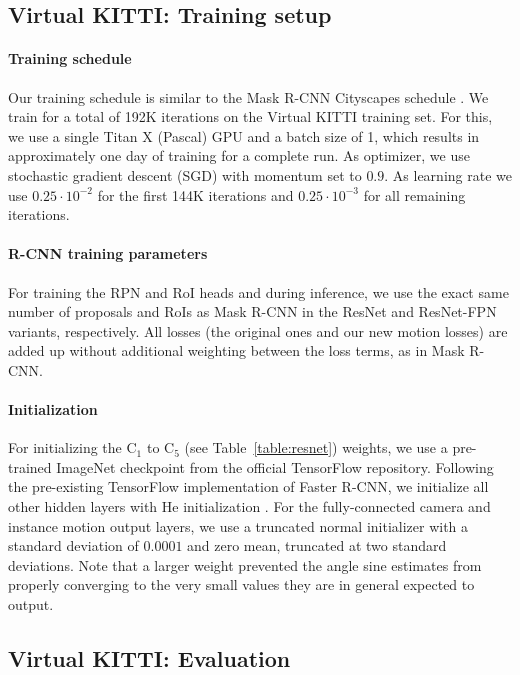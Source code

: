 \subsection{Virtual KITTI: Training setup}
\label{ssec:setup}

\paragraph{Training schedule}
Our training schedule is similar to the Mask R-CNN Cityscapes schedule \cite{MaskRCNN}.
We train for a total of 192K iterations on the Virtual KITTI training set.
For this, we use a single Titan X (Pascal) GPU and a batch size of 1,
which results in approximately one day of training for a complete run.
As optimizer, we use stochastic gradient descent (SGD) \cite{SGD} with
momentum set to $0.9$.
As learning rate we use $0.25 \cdot 10^{-2}$ for the
first 144K iterations and $0.25 \cdot 10^{-3}$ for all remaining iterations.

\paragraph{R-CNN training parameters}
For training the RPN and RoI heads and during inference,
we use the exact same number of proposals and RoIs as Mask R-CNN in
the ResNet and ResNet-FPN variants, respectively.
All losses (the original ones and our new motion losses)
are added up without additional weighting between the loss terms,
as in Mask R-CNN.

\paragraph{Initialization}
For initializing the  C$_1$ to C$_5$ (see Table~\ref{table:resnet}) weights, we use a pre-trained
ImageNet \cite{ImageNet} checkpoint from the official TensorFlow repository.
Following the pre-existing TensorFlow implementation of Faster R-CNN,
we initialize all other hidden layers with He initialization \cite{He}.
For the fully-connected camera and instance motion output layers,
we use a truncated normal initializer with a standard
deviation of $0.0001$ and zero mean, truncated at two standard deviations.
Note that a larger weight prevented the
angle sine estimates from properly converging to the very small values they
are in general expected to output.

\subsection{Virtual KITTI: Evaluation}
\label{ssec:vkitti}

